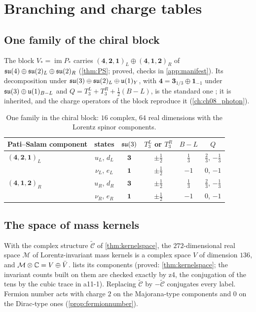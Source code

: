 \chapter{Branching and charge tables}
\label{app:branching}

\section{One family of the chiral block}
\label{app:branching:family}

The block $V_*=\operatorname{im}P_*$ carries $(\mathbf4,\mathbf2,\mathbf1)_L\oplus(\mathbf4,\mathbf1,\mathbf2)_R$ of
$\mathfrak{su}(4)\oplus\mathfrak{su}(2)_L\oplus\mathfrak{su}(2)_R$ (\cref{thm:PS}; proved, checks in \cref{app:manifest}). Its decomposition under
$\mathfrak{su}(3)\oplus\mathfrak{su}(2)_L\oplus\mathfrak{u}(1)_Y$, with $\mathbf4=\mathbf3_{1/3}\oplus\mathbf1_{-1}$ under $\mathfrak{su}(3)\oplus\mathfrak{u}(1)_{B-L}$ and
$Q=T^L_3+T^R_3+\tfrac12(B-L)$, is the standard one \cite{PatiSalam}; it is inherited, and the charge operators of the block reproduce it
(\cref{ch:ch08_photon}).

\begin{table}[ht]
\centering\small
\begin{tabular}{@{}lccccc@{}}
\toprule
Pati--Salam component & states & $\mathfrak{su}(3)$ & $T^L_3$ or $T^R_3$ & $B-L$ & $Q$\\
\midrule
$(\mathbf4,\mathbf2,\mathbf1)_L$ & $u_L$, $d_L$ & $\mathbf3$ & $\pm\tfrac12$ & $\tfrac13$ & $\tfrac23$, $-\tfrac13$\\
 & $\nu_L$, $e_L$ & $\mathbf1$ & $\pm\tfrac12$ & $-1$ & $0$, $-1$\\
$(\mathbf4,\mathbf1,\mathbf2)_R$ & $u_R$, $d_R$ & $\mathbf3$ & $\pm\tfrac12$ & $\tfrac13$ & $\tfrac23$, $-\tfrac13$\\
 & $\nu_R$, $e_R$ & $\mathbf1$ & $\pm\tfrac12$ & $-1$ & $0$, $-1$\\
\bottomrule
\end{tabular}
\caption{One family in the chiral block: $16$ complex, $64$ real dimensions with the Lorentz spinor components.}
\label{tab:app:family}
\end{table}

\section{The space of mass kernels}
\label{app:branching:kernels}

With the complex structure $\widetilde{\mathcal C}$ of \cref{thm:kernelspace}, the $272$-dimensional real space $\mathcal M$ of Lorentz-invariant mass
kernels is a complex space $V$ of dimension $136$, and $\mathcal M\otimes\mathbb{C}=V\oplus\bar V$.  lists its
components (proved: \cref{thm:kernelspace}; the invariant counts built on them are checked exactly by z4, the conjugation of the tens by the cubic
trace in a11-1). Replacing $\widetilde{\mathcal C}$ by $-\widetilde{\mathcal C}$ conjugates every label. Fermion number acts with charge $2$ on the Majorana-type components and $0$ on the Dirac-type
ones (\cref{prop:fermionnumber}).

